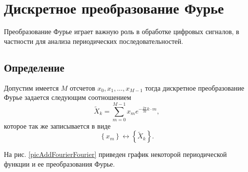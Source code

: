 \section{Дискретное преобразование Фурье}
\label{AddFourier}

Преобразование Фурье играет важную
роль в обработке цифровых сигналов, в частности для анализа
периодических последовательностей.
\subsection{Определение}
\begin{definition}
Допустим имеется $M$ отсчетов $x_0, x_1, \dots, x_{M-1}$ тогда
дискретное преобразование Фурье задается следующим соотношением
\begin{equation}
\tilde{X}_k = \sum^{M - 1}_{m = 0} x_m e^{-\frac{2 \pi}{M} k\cdot m},
\label{eqAddFourierDiscretFourier}
\end{equation}
которое так же записывается в виде
\begin{equation}
\left\{x_m\right\} \longleftrightarrow \left\{\tilde{X}_k\right\}.
\nonumber
\end{equation}
\end{definition}

На рис. \ref{picAddFourierFourier} приведен график некоторой
периодической функции и ее преобразования Фурье. 



